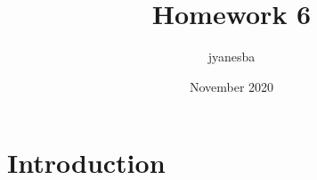 \documentclass{article}
\title{Homework 6}
\author{jyanesba }
\date{November 2020}
\begin{document}
\maketitle

\section{Introduction}
\end{document}
